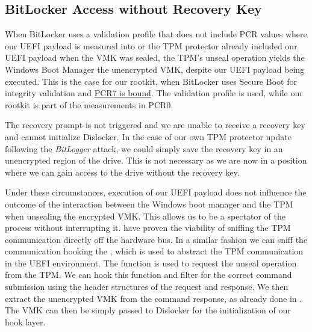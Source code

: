 \subsection{BitLocker Access without Recovery Key}
\label{sec:attacks:bitlocker:bitlocker-access-without-recovery-key}

When BitLocker uses a validation profile that does not include \ac{PCR} values where our \ac{UEFI} payload is measured into or the \ac{TPM} protector already included our \ac{UEFI} payload when the \ac{VMK} was sealed, the \ac{TPM}'s unseal operation yields the Windows Boot Manager the unencrypted \ac{VMK}, despite our \ac{UEFI} payload being executed.
This is the case for our rootkit, when BitLocker uses Secure Boot for integrity validation and \hyperlink{pcr7-binding}{\ac{PCR}7 is bound}.
The validation profile \hyperref[tab:pcr-usage]{} is used, while our rootkit is part of the measurements in \ac{PCR}0.

The recovery prompt is not triggered and we are unable to receive a recovery key and cannot initialize Dislocker.
In the case of our own \ac{TPM} protector update following the \emph{BitLogger} attack, we could simply save the recovery key in an unencrypted region of the drive.
This is not necessary as we are now in a position where we can gain access to the drive without the recovery key.

Under these circumstances, execution of our \ac{UEFI} payload does not influence the outcome of the interaction between the Windows boot manager and the \ac{TPM} when unsealing the encrypted \ac{VMK}.
This allows us to be a spectator of the process without interrupting it.
\cite{tpm-spi-sniffing, tpm-lpc-sniffing} have proven the viability of sniffing the \ac{TPM} communication directly off the hardware bus.
In a similar fashion we can sniff the communication hooking the , which is used to abstract the \ac{TPM} communication in the \ac{UEFI} environment.
The  function is used to request the unseal operation from the \ac{TPM}.
We can hook this function and filter for the correct command submission using the header structures of the request and response.
We then extract the unencrypted \ac{VMK} from the command response, as already done in \cite{tpm-lpc-sniffing}.
The \ac{VMK} can then be simply passed to Dislocker for the initialization of our hook layer.